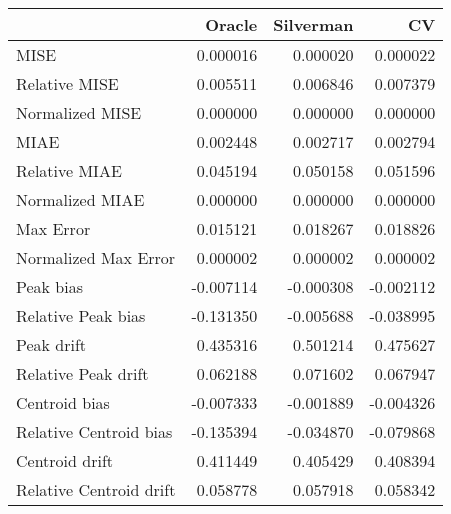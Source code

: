 \begin{tabular}{lrrr}
  \hline
 & Oracle & Silverman & CV \\ 
  \hline
MISE & 0.000016 & 0.000020 & 0.000022 \\ 
  Relative MISE & 0.005511 & 0.006846 & 0.007379 \\ 
  Normalized MISE & 0.000000 & 0.000000 & 0.000000 \\ 
  MIAE & 0.002448 & 0.002717 & 0.002794 \\ 
  Relative MIAE & 0.045194 & 0.050158 & 0.051596 \\ 
  Normalized MIAE & 0.000000 & 0.000000 & 0.000000 \\ 
  Max Error & 0.015121 & 0.018267 & 0.018826 \\ 
  Normalized Max Error & 0.000002 & 0.000002 & 0.000002 \\ 
  Peak bias & -0.007114 & -0.000308 & -0.002112 \\ 
  Relative Peak bias & -0.131350 & -0.005688 & -0.038995 \\ 
  Peak drift & 0.435316 & 0.501214 & 0.475627 \\ 
  Relative Peak drift & 0.062188 & 0.071602 & 0.067947 \\ 
  Centroid bias & -0.007333 & -0.001889 & -0.004326 \\ 
  Relative Centroid bias & -0.135394 & -0.034870 & -0.079868 \\ 
  Centroid drift & 0.411449 & 0.405429 & 0.408394 \\ 
  Relative Centroid drift & 0.058778 & 0.057918 & 0.058342 \\ 
   \hline
\end{tabular}
